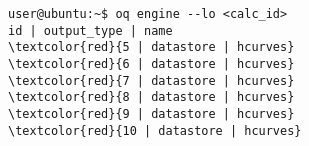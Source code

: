 \begin{Verbatim}[frame=single, commandchars=\\\{\}, fontsize=\small]
user@ubuntu:~$ oq engine --lo <calc_id>
id | output_type | name
\textcolor{red}{5 | datastore | hcurves}
\textcolor{red}{6 | datastore | hcurves}
\textcolor{red}{7 | datastore | hcurves}
\textcolor{red}{8 | datastore | hcurves}
\textcolor{red}{9 | datastore | hcurves}
\textcolor{red}{10 | datastore | hcurves}
\end{Verbatim}